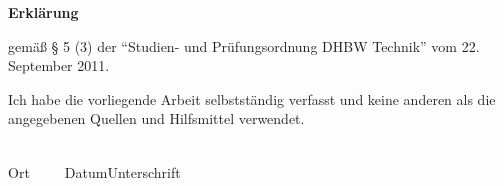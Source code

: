 


\newpage
\thispagestyle{empty}
\begin{framed}
\begin{center}
\Large\bfseries \textsf{Erklärung}
\end{center}

\noindent
gemäß § 5 (3) der "`Studien- und Prüfungsordnung DHBW Technik"' vom 22. September 2011. 


\noindent
Ich habe die vorliegende Arbeit selbstständig verfasst und keine anderen als die angegebenen
Quellen und Hilfsmittel verwendet.

\vspace{3cm}
\noindent
\underline{\hspace{4cm}}\hfill\underline{\hspace{6cm}}\\
Ort~~~~~Datum\hfill Unterschrift\hspace{3.85cm}


%
%
%

\end{framed}



\endinput
